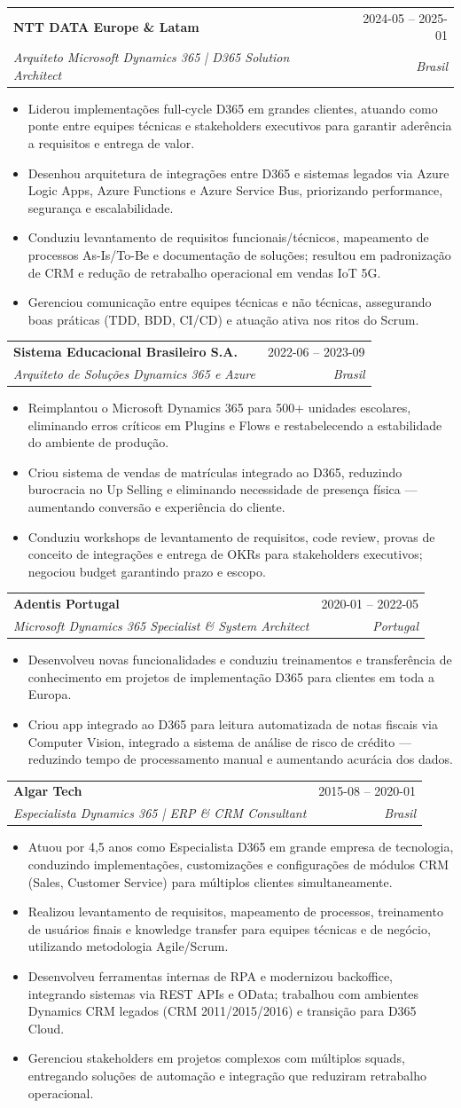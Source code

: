 \documentclass[a4paper,11pt]{article}
\makeatletter
\newcommand{\resumeItem}[1]{
  \item\small{
    {#1 \vspace{-2pt}}
  }
}
\newcommand{\resumeSubheading}[4]{
  \vspace{-1pt}\item
  \begin{tabular*}{0.97\textwidth}{l@{\extracolsep{\fill}}r}
    \textbf{#1} & #2 \\
    \textit{\small#3} & \textit{\small #4} \\
  \end{tabular*}\vspace{-5pt}
}
\newcommand{\resumeItemListStart}{\begin{itemize}}
\newcommand{\resumeItemListEnd}{\end{itemize}\vspace{-5pt}}
\makeatother
\begin{document}
\resumeSubheading
{NTT DATA Europe \& Latam}{2024-05 – 2025-01}
{Arquiteto Microsoft Dynamics 365 | D365 Solution Architect}{Brasil}
\resumeItemListStart
\resumeItem{Liderou implementações full-cycle D365 em grandes clientes, atuando como ponte entre equipes técnicas e stakeholders executivos para garantir aderência a requisitos e entrega de valor.}
\resumeItem{Desenhou arquitetura de integrações entre D365 e sistemas legados via Azure Logic Apps, Azure Functions e Azure Service Bus, priorizando performance, segurança e escalabilidade.}
\resumeItem{Conduziu levantamento de requisitos funcionais/técnicos, mapeamento de processos As-Is/To-Be e documentação de soluções; resultou em padronização de CRM e redução de retrabalho operacional em vendas IoT 5G.}
\resumeItem{Gerenciou comunicação entre equipes técnicas e não técnicas, assegurando boas práticas (TDD, BDD, CI/CD) e atuação ativa nos ritos do Scrum.}
\resumeItemListEnd

\resumeSubheading
{Sistema Educacional Brasileiro S.A.}{2022-06 – 2023-09}
{Arquiteto de Soluções Dynamics 365 e Azure}{Brasil}
\resumeItemListStart
\resumeItem{Reimplantou o Microsoft Dynamics 365 para 500+ unidades escolares, eliminando erros críticos em Plugins e Flows e restabelecendo a estabilidade do ambiente de produção.}
\resumeItem{Criou sistema de vendas de matrículas integrado ao D365, reduzindo burocracia no Up Selling e eliminando necessidade de presença física — aumentando conversão e experiência do cliente.}
\resumeItem{Conduziu workshops de levantamento de requisitos, code review, provas de conceito de integrações e entrega de OKRs para stakeholders executivos; negociou budget garantindo prazo e escopo.}
\resumeItemListEnd

\resumeSubheading
{Adentis Portugal}{2020-01 – 2022-05}
{Microsoft Dynamics 365 Specialist \& System Architect}{Portugal}
\resumeItemListStart
\resumeItem{Desenvolveu novas funcionalidades e conduziu treinamentos e transferência de conhecimento em projetos de implementação D365 para clientes em toda a Europa.}
\resumeItem{Criou app integrado ao D365 para leitura automatizada de notas fiscais via Computer Vision, integrado a sistema de análise de risco de crédito — reduzindo tempo de processamento manual e aumentando acurácia dos dados.}
\resumeItemListEnd

\resumeSubheading
{Algar Tech}{2015-08 – 2020-01}
{Especialista Dynamics 365 | ERP \& CRM Consultant}{Brasil}
\resumeItemListStart
\resumeItem{Atuou por 4,5 anos como Especialista D365 em grande empresa de tecnologia, conduzindo implementações, customizações e configurações de módulos CRM (Sales, Customer Service) para múltiplos clientes simultaneamente.}
\resumeItem{Realizou levantamento de requisitos, mapeamento de processos, treinamento de usuários finais e knowledge transfer para equipes técnicas e de negócio, utilizando metodologia Agile/Scrum.}
\resumeItem{Desenvolveu ferramentas internas de RPA e modernizou backoffice, integrando sistemas via REST APIs e OData; trabalhou com ambientes Dynamics CRM legados (CRM 2011/2015/2016) e transição para D365 Cloud.}
\resumeItem{Gerenciou stakeholders em projetos complexos com múltiplos squads, entregando soluções de automação e integração que reduziram retrabalho operacional.}
\resumeItemListEnd
\end{document}

